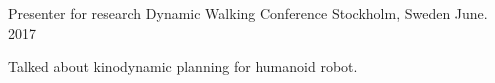 

\begin{cventries}

  \cventry
    {Presenter for research} %
    {Dynamic Walking Conference} %
    {Stockholm, Sweden} %
    {June. 2017} %
    {
      \begin{cvitems} %
        \item {Talked about kinodynamic planning for humanoid robot.}
      \end{cvitems}
    }

\end{cventries}

